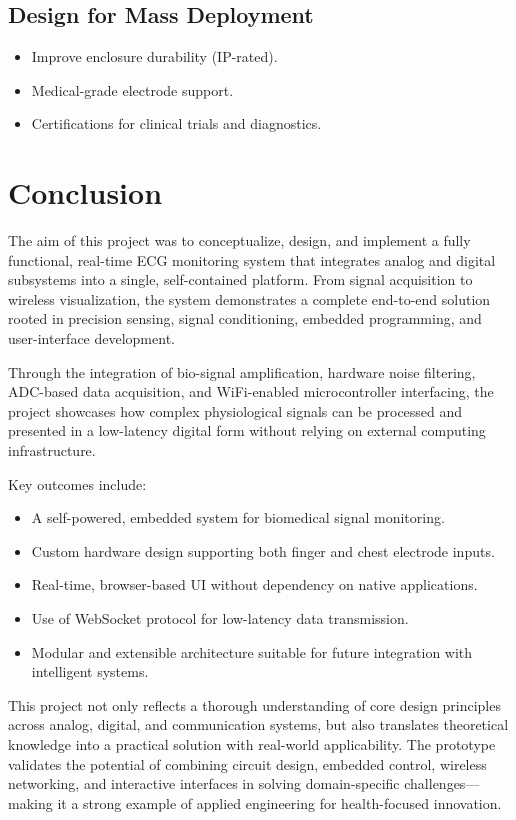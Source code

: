 \section{Design for Mass Deployment}
\begin{itemize}
    \item Improve enclosure durability (IP-rated).
    \item Medical-grade electrode support.
    \item Certifications for clinical trials and diagnostics.
\end{itemize}




\chapter{Conclusion}

The aim of this project was to conceptualize, design, and implement a fully functional, real-time ECG monitoring system that integrates analog and digital subsystems into a single, self-contained platform. From signal acquisition to wireless visualization, the system demonstrates a complete end-to-end solution rooted in precision sensing, signal conditioning, embedded programming, and user-interface development.

Through the integration of bio-signal amplification, hardware noise filtering, ADC-based data acquisition, and WiFi-enabled microcontroller interfacing, the project showcases how complex physiological signals can be processed and presented in a low-latency digital form without relying on external computing infrastructure.

Key outcomes include:
\begin{itemize}
    \item A self-powered, embedded system for biomedical signal monitoring.
    \item Custom hardware design supporting both finger and chest electrode inputs.
    \item Real-time, browser-based UI without dependency on native applications.
    \item Use of WebSocket protocol for low-latency data transmission.
    \item Modular and extensible architecture suitable for future integration with intelligent systems.
\end{itemize}

This project not only reflects a thorough understanding of core design principles across analog, digital, and communication systems, but also translates theoretical knowledge into a practical solution with real-world applicability. The prototype validates the potential of combining circuit design, embedded control, wireless networking, and interactive interfaces in solving domain-specific challenges—making it a strong example of applied engineering for health-focused innovation.
